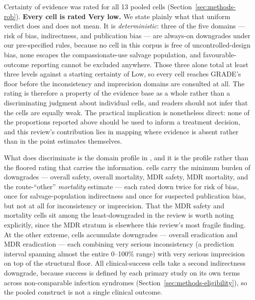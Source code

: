Certainty of evidence was rated for all 13 pooled cells (Section~\ref{sec:methods-rob}). \textbf{Every cell is rated Very low.} We state plainly what that uniform verdict does and does not mean. It is \emph{deterministic}: three of the five domains --- risk of bias, indirectness, and publication bias --- are always-on downgrades under our pre-specified rules, because no cell in this corpus is free of uncontrolled-design bias, none escapes the compassionate-use salvage population, and favourable-outcome reporting cannot be excluded anywhere. Those three alone total at least three levels against a starting certainty of Low, so every cell reaches GRADE's floor before the inconsistency and imprecision domains are consulted at all. The rating is therefore a property of the evidence base as a whole rather than a discriminating judgment about individual cells, and readers should not infer that the cells are equally weak. The practical implication is nonetheless direct: none of the proportions reported above should be used to inform a treatment decision, and this review's contribution lies in mapping where evidence is absent rather than in the point estimates themselves.

What does discriminate is the domain profile in , and it is the profile rather than the floored rating that carries the information. \GradeCellsAtMin cells carry the minimum burden of \GradeMinDowngrades downgrades --- overall safety, overall mortality, MDR safety, MDR mortality, and the route-``other'' \emph{mortality} estimate --- each rated down twice for risk of bias, once for salvage-population indirectness and once for suspected publication bias, but not at all for inconsistency or imprecision. That the MDR safety and mortality cells sit among the least-downgraded in the review is worth noting explicitly, since the MDR stratum is elsewhere this review's most fragile finding. At the other extreme, \GradeCellsAtMax cells accumulate \GradeMaxDowngrades downgrades --- overall eradication and MDR eradication --- each combining very serious inconsistency (a prediction interval spanning almost the entire 0--100\% range) with very serious imprecision on top of the structural floor. All \GradeClinicalSuccessCells clinical-success cells take a second indirectness downgrade, because success is defined by each primary study on its own terms across non-comparable infection syndromes (Section~\ref{sec:methods-eligibility}), so the pooled construct is not a single clinical outcome.

